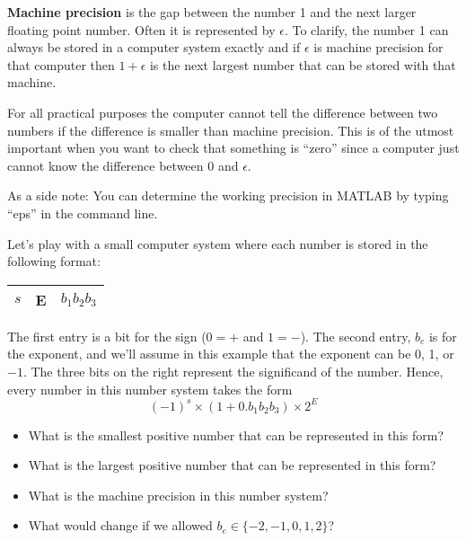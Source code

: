 \begin{definition}
    {\bf Machine precision} is the gap between the number 1 and the next larger floating
    point number. Often it is represented by $\epsilon$. To clarify, the number 1 can
    always be stored in a computer system exactly and if $\epsilon$ is machine
    precision for that computer then $1+\epsilon$ is the next largest number that can
    be stored with that machine. 
\end{definition}
For all practical purposes
the computer cannot tell the difference between two numbers if the difference is smaller
than machine precision. This is of the utmost important when you want to check that
something is ``zero'' since a computer
just cannot know the difference between $0$ and $\epsilon$.

As a side note: You can determine the working precision in MATLAB by typing ``eps'' in the
command line.



\begin{problem}
Let's play with a small computer system where each number is stored in the following
    format:
    \begin{center}
        \begin{tabular}{|c|c|c|}
            \hline
            $s$ & E & $b_1b_2b_3$ \\ \hline
        \end{tabular}
    \end{center}
    The first entry is a bit for the sign (0$=+$ and $1=-$). The second entry, $b_e$ is for the
    exponent, and we'll assume in this example that the exponent can be 0, 1, or $-1$.  The
    three bits on the right represent the significand of the number.  Hence, every number in
    this number system takes the form
    \[ (-1)^s \times (1+ 0.b_1b_2b_3) \times 2^{E} \]
    \begin{itemize}
        \item What is the smallest positive number that can be represented in this
            form?\\
        \item What is the largest positive number that can be represented in this
            form?\\
        \item What is the machine precision in this number system? \\
        \item What would change if we allowed $b_e \in \{-2,-1,0,1,2\}$?\\
    \end{itemize}
\end{problem}


